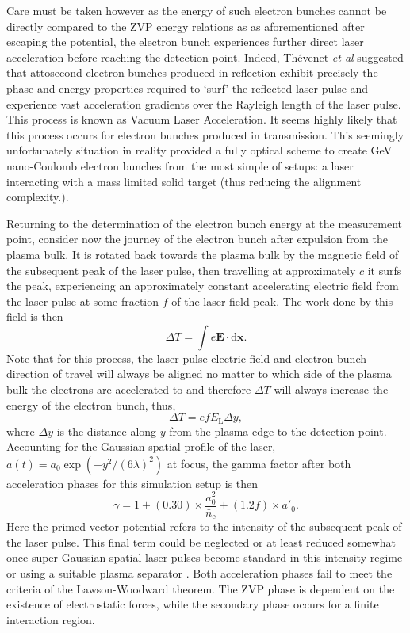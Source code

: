 Care must be taken however as the energy of such electron bunches cannot be directly compared to the ZVP energy relations as as aforementioned after escaping the potential, the electron bunch experiences further direct laser acceleration before reaching the detection point. Indeed, Thévenet \textit{et al} \cite{thevenetVacuumLaserAcceleration2016} suggested that attosecond electron bunches produced in reflection exhibit precisely the phase and energy properties required to `surf' the reflected laser pulse and experience vast acceleration gradients over the Rayleigh length of the laser pulse. This process is known as Vacuum Laser Acceleration. It seems highly likely that this process occurs for electron bunches produced in transmission. This seemingly unfortunately situation in reality provided a fully optical scheme to create GeV nano-Coulomb electron bunches from the most simple of setups: a laser interacting with a mass limited solid target (thus reducing the alignment complexity.). 

Returning to the determination of the electron bunch energy at the measurement point, consider now the journey of the electron bunch after expulsion from the plasma bulk. It is rotated back towards the plasma bulk by the magnetic field of the subsequent peak of the laser pulse, then travelling at approximately $c$ it surfs the peak, experiencing an approximately constant accelerating electric field from the laser pulse at some fraction $f$ of the laser field peak. The work done by this field is then
\begin{equation}
	\Delta T = \int e \mathbf{E} \cdot \mathrm{d}\mathbf{x}.
\end{equation}
Note that for this process, the laser pulse electric field and electron bunch direction of travel will always be aligned no matter to which side of the plasma bulk the electrons are accelerated to and therefore $\Delta T$ will always increase the energy of the electron bunch, thus,
\begin{equation}
	\Delta T = e f E_\mathrm{L} \Delta y,
\end{equation}
where $\Delta y$ is the distance along $y$ from the plasma edge to the detection point. Accounting for the Gaussian spatial profile of the laser, $a(t) = a_0 \exp(-y^2/(6\lambda)^2)$ at focus, the gamma factor after both acceleration phases for this simulation setup is then
\begin{equation}\label{eq:zvp-gamma}
	\gamma = 1 + (0.30)\times \frac{a^2_0}{\bar{n}_\mathrm{e}} + (1.2f)\times a'_0.
\end{equation}
Here the primed vector potential refers to the intensity of the subsequent peak of the laser pulse. This final term could be neglected or at least reduced somewhat once super-Gaussian spatial laser pulses become standard in this intensity regime or using a suitable plasma separator \cite{miyauchiLaserElectronAcceleration2004}. Both acceleration phases fail to meet the criteria of the Lawson-Woodward theorem. The ZVP phase is dependent on the existence of electrostatic forces, while the secondary phase occurs for a finite interaction region.

